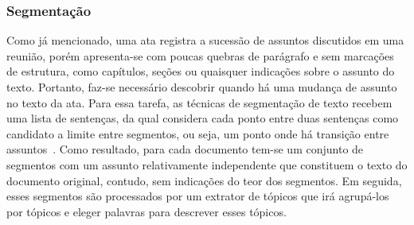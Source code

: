 














\subsubsection{Segmentação}

Como já mencionado, uma ata registra a sucessão de assuntos discutidos em uma reunião, porém apresenta-se com poucas quebras de parágrafo e sem marcações de estrutura, como capítulos, seções ou quaisquer indicações sobre o assunto do texto. Portanto, faz-se necessário descobrir quando há uma mudança de assunto no texto da ata. Para essa tarefa, as técnicas de segmentação de texto recebem uma lista de sentenças, da qual considera cada ponto entre duas sentenças como candidato a limite entre segmentos, ou seja, um ponto onde há transição entre assuntos~\cite{Bokaei2016}. Como resultado, para cada documento tem-se um conjunto de segmentos com um assunto relativamente independente que constituem o texto do documento original, contudo, sem indicações do teor dos segmentos. Em seguida, esses segmentos são processados por um extrator de tópicos que irá agrupá-los por tópicos e eleger palavras para descrever esses tópicos.

